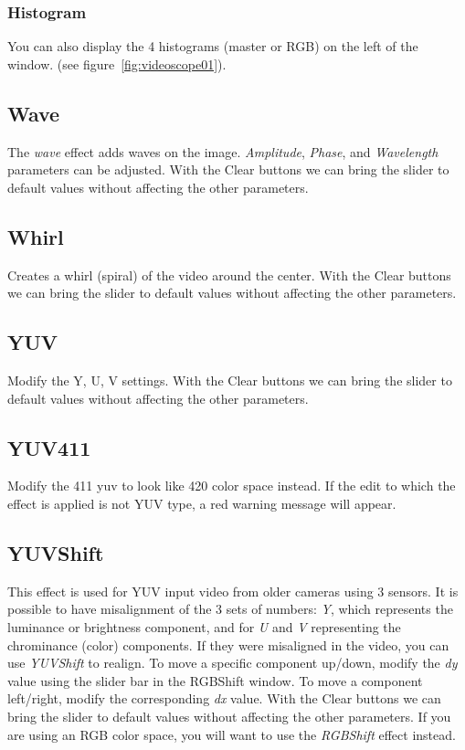 \subsubsection*{Histogram}%
\label{ssub:histogram}

You can also display the 4 histograms (master or RGB) on the left of the window. (see figure~\ref{fig:videoscope01}).

\subsection{Wave}%
\label{sub:wave}

The \textit{wave} effect adds waves on the image. \textit{Amplitude}, \textit{Phase}, and \textit{Wavelength} parameters can be adjusted. With the Clear buttons we can bring the slider to default values without affecting the other parameters.

\subsection{Whirl}%
\label{sub:whirl}

Creates a whirl (spiral) of the video around the center. With the Clear buttons we can bring the slider to default values without affecting the other parameters.

\subsection{YUV}%
\label{sub:yuv}

Modify the Y, U, V settings. With the Clear buttons we can bring the slider to default values without affecting the other parameters.

\subsection{YUV411}%
\label{sub:yuv411}

Modify the 411 yuv to look like 420 color space instead. If the edit to which the effect is applied is not YUV type, a red warning message will appear.

\subsection{YUVShift}%
\label{sub:yuvshift}

This effect is used for YUV input video from older cameras using $3$ sensors. It is possible to have misalignment of the $3$ sets of numbers: \textit{Y}, which represents the luminance or brightness component, and for \textit{U} and \textit{V} representing the chrominance (color) components. If they were misaligned in the video, you can use \textit{YUVShift} to realign. To move a specific component up/down, modify the \textit{dy} value using the slider bar in the RGBShift window. To move a component left/right, modify the corresponding \textit{dx} value. With the Clear buttons we can bring the slider to default values without affecting the other parameters. If you are using an RGB color space, you will want to use the \textit{RGBShift} effect instead.

